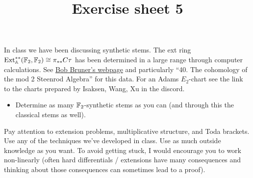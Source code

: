 \documentclass[reqno]{amsart}
\title{Exercise sheet 5}
\begin{document}
\maketitle

In class we have been discussing synthetic stems.
The ext ring $\operatorname{Ext}_{\mathbb{A}}^{**}(\mathbb{F}_2,\mathbb{F}_2) \cong \pi_{**}C\tau$ has been determined in a large range through computer calculations.
See \href{http://www.rrb.wayne.edu/papers/index.html}{Bob Bruner's webpage} and particularly ``40. The cohomology of the mod 2 Steenrod Algebra'' for this data.
For an Adams $E_2$-chart see the link to the charts prepared by Isaksen, Wang, Xu
in the discord.

\begin{itemize}
\item Determine as many $\mathbb{F}_2$-synthetic stems as you can (and through this the classical stems as well).
\end{itemize}

Pay attention to extension problems, multiplicative structure, and Toda brackets.
Use any of the techniques we've developed in class.
Use as much outside knowledge as you want.
To avoid getting stuck, I would encourage you to work non-linearly (often hard differentials / extensions have many consequences and thinking about those consequences can sometimes lead to a proof).



\end{document}
